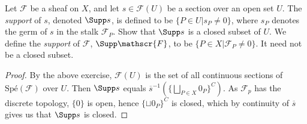\begin{exercise}[Support]%
	Let $\mathscr{F} $ be a sheaf on $X $, and let $s \in \mathscr{F}(U) $ be a section over an open set $U $. The \textit{support} of $s $, denoted $\Supp s $, is defined to be $\{P \in U | s_P \ne 0\}   $, where $s_P $ denotes the germ of $s $ in the stalk $\mathscr{F}_P $. Show that $\Supp s $ is a closed subset of $U $. We define the \textit{support} of $\mathscr{F} $, $\Supp \mathscr{F} $, to be $\{P \in X | \mathscr{F}_P \ne 0\}   $. It need not be a closed subset.
\end{exercise}
\begin{proof}
	By the above exercise, $\mathscr{F}(U) $ is the set of all continuous sections of $\text{Sp\'e}(\mathscr{F}) $ over $U $.
	Then $\Supp s $ equals $\overline{s}^{-1}(\{\bigsqcup_{P\in X} 0_P\}^C)   $.
	As $\mathscr{F}_p $ has the discrete topology, $\{0\}   $ is open, hence $\{\sqcup 0_P\} ^C  $ is closed, which by continuity of $\overline{s}  $ gives us that $\Supp s $ is closed.
\end{proof}

